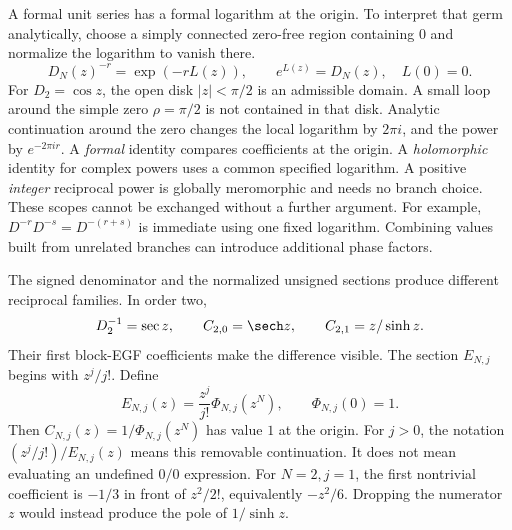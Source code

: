 A formal unit series has a formal logarithm at the origin. To interpret that germ analytically, choose a simply connected zero-free region containing $0$ and normalize the logarithm to vanish there.
\[
D_N(z)^{-r}=\exp(-rL(z)),\qquad e^{L(z)}=D_N(z),\quad L(0)=0.
\]
For $D_2=\cos z$, the open disk $|z|<\pi/2$ is an admissible domain. A small loop around the simple zero $\rho=\pi/2$ is not contained in that disk. Analytic continuation around the zero changes the local logarithm by $2\pi i$, and the power by $e^{-2\pi ir}$.
A \emph{formal} identity compares coefficients at the origin. A \emph{holomorphic} identity for complex powers uses a common specified logarithm. A positive \emph{integer} reciprocal power is globally meromorphic and needs no branch choice. These scopes cannot be exchanged without a further argument.
For example, $D^{-r}D^{-s}=D^{-(r+s)}$ is immediate using one fixed logarithm. Combining values built from unrelated branches can introduce additional phase factors.

The signed denominator and the normalized unsigned sections produce different reciprocal families. In order two,
\[
D_2^{-1}=\sec z,\qquad C_{2,0}=\sech z,\qquad C_{2,1}=z/\sinh z.
\]
Their first block-EGF coefficients make the difference visible.
The section $E_{N,j}$ begins with $z^j/j!$. Define
\[
E_{N,j}(z)=\frac{z^j}{j!}\Phi_{N,j}(z^N),\qquad\Phi_{N,j}(0)=1.
\]
Then $C_{N,j}(z)=1/\Phi_{N,j}(z^N)$ has value $1$ at the origin. For $j>0$, the notation $(z^j/j!)/E_{N,j}(z)$ means this removable continuation. It does not mean evaluating an undefined $0/0$ expression.
For $N=2,j=1$, the first nontrivial coefficient is $-1/3$ in front of $z^2/2!$, equivalently $-z^2/6$. Dropping the numerator $z$ would instead produce the pole of $1/\sinh z$.

